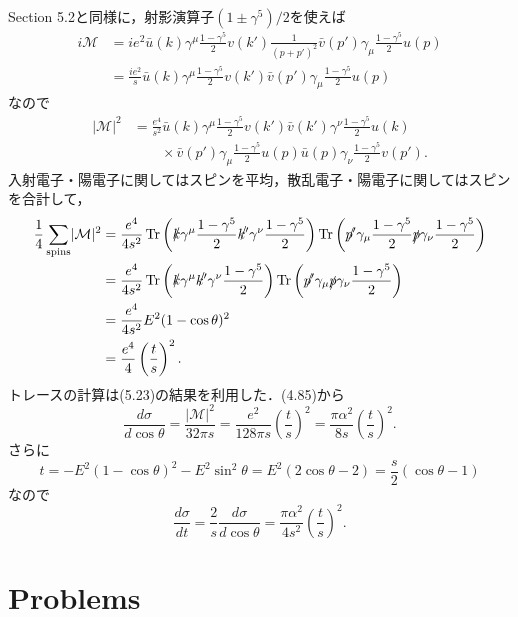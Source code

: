 Section 5.2と同様に，射影演算子$(1\pm\gamma^5)/2$を使えば
\begin{align*}
  i\mathcal{M} &= ie^2 \bar{u}(k) \gamma^\mu \frac{1-\gamma^5}{2} v(k') \frac{1}{(p+p')^2}
  \bar{v}(p') \gamma_\mu \frac{1-\gamma^5}{2} u(p) \\
  &= \frac{ie^2}{s} \bar{u}(k) \gamma^\mu \frac{1-\gamma^5}{2} v(k') \bar{v}(p') \gamma_\mu \frac{1-\gamma^5}{2} u(p)
\end{align*}
なので
\begin{align*}
  \lvert\mathcal{M}\rvert^2
  &= \frac{e^4}{s^2} \bar{u}(k) \gamma^\mu \frac{1-\gamma^5}{2} v(k') \bar{v}(k') \gamma^\nu \frac{1-\gamma^5}{2} u(k) \\
  &\qquad\times \bar{v}(p') \gamma_\mu \frac{1-\gamma^5}{2} u(p) \bar{u}(p) \gamma_\nu \frac{1-\gamma^5}{2} v(p') .
\end{align*}
入射電子・陽電子に関してはスピンを平均，散乱電子・陽電子に関してはスピンを合計して，
\begin{align*}
  \frac{1}{4} \sum_\text{spins} \lvert\mathcal{M}\rvert^2
  &= \frac{e^4}{4s^2} \operatorname{Tr}\left( \slashed{k} \gamma^\mu \frac{1-\gamma^5}{2} \slashed{k'} \gamma^\nu \frac{1-\gamma^5}{2} \right)
  \operatorname{Tr}\left( \slashed{p'} \gamma_\mu \frac{1-\gamma^5}{2} \slashed{p} \gamma_\nu \frac{1-\gamma^5}{2} \right) \\
  &= \frac{e^4}{4s^2} \operatorname{Tr}\left( \slashed{k} \gamma^\mu \slashed{k'} \gamma^\nu \frac{1-\gamma^5}{2} \right)
  \operatorname{Tr}\left( \slashed{p'} \gamma_\mu \slashed{p} \gamma_\nu \frac{1-\gamma^5}{2} \right) \\
  &= \frac{e^4}{4s^2} E^2 (1-\cos\theta)^2 \\
  &= \frac{e^4}{4} \left(\frac{t}{s}\right)^2 .
\end{align*}
トレースの計算は(5.23)の結果を利用した．(4.85)から
\[
\frac{d\sigma}{d\cos\theta} = \frac{\lvert\mathcal{M}\rvert^2}{32\pi s}
= \frac{e^2}{128\pi s} \left(\frac{t}{s}\right)^2 = \frac{\pi\alpha^2}{8s} \left(\frac{t}{s}\right)^2 .
\]
さらに
\[ t = - E^2 (1-\cos\theta)^2 - E^2\sin^2\theta = E^2 (2\cos\theta-2) = \frac{s}{2} (\cos\theta-1) \]
なので
\[ \frac{d\sigma}{dt} = \frac{2}{s} \frac{d\sigma}{d\cos\theta} = \frac{\pi\alpha^2}{4s^2} \left(\frac{t}{s}\right)^2 . \]

\section*{Problems}
